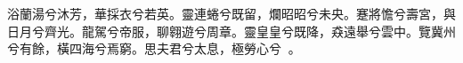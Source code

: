
\begin{pinyinscope}
浴蘭湯兮沐芳，華採衣兮若英。靈連蜷兮既留，爛昭昭兮未央。蹇將憺兮壽宮，與日月兮齊光。龍駕兮帝服，聊翱遊兮周章。靈皇皇兮既降，猋遠舉兮雲中。覽冀州兮有餘，橫四海兮焉窮。思夫君兮太息，極勞心兮𢥞𢥞。


\end{pinyinscope}